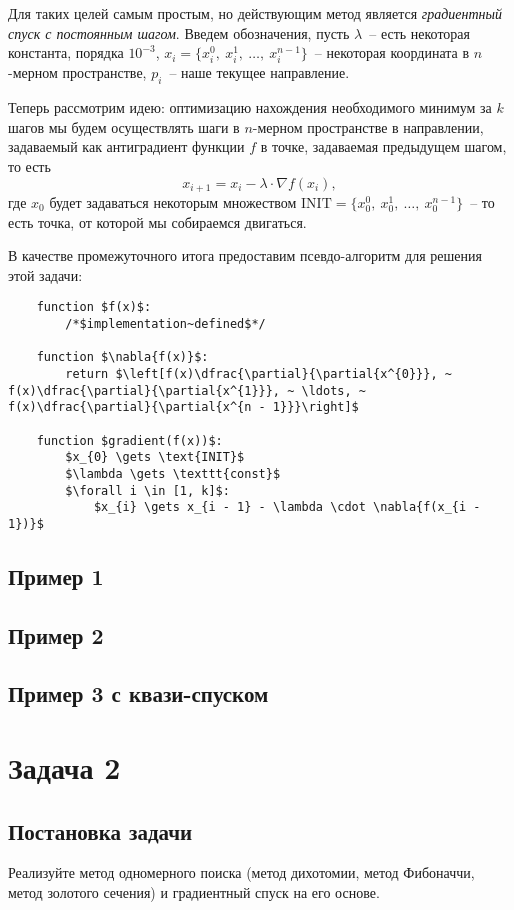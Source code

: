 \documentclass[12pt, a4paper, oneside]{article}
\begin{document}
	Для таких целей самым простым, но действующим метод является \textit{градиентный спуск с постоянным шагом}. 	Введем обозначения, пусть $\lambda$~-- есть некоторая константа, порядка $10^{-3}$, $x_{i} = \{x^{0}_{i}, ~ x^{1}_{i}, ~ \ldots, ~ x^{n - 1}_{i}\}$~-- некоторая координата в $n$-мерном пространстве, $p_{i}$~-- наше текущее направление.

	Теперь рассмотрим идею: оптимизацию нахождения необходимого минимум за $k$ шагов мы будем осуществлять шаги в $n$-мерном пространстве в направлении, задаваемый как антиградиент функции $f$ в точке, задаваемая предыдущем шагом, то есть
	\[
		x_{i + 1} = x_{i} - \lambda \cdot \nabla{f(x_{i})},
	\] где $x_{0}$ будет задаваться некоторым множеством $\text{INIT} = \{x^{0}_{0}, ~ x^{1}_{0}, ~ \ldots, ~ x^{n - 1}_{0}\}$~-- то есть точка, от которой мы собираемся двигаться.

	В качестве промежуточного итога предоставим псевдо-алгоритм для решения этой задачи:
	\begin{lstlisting}
	function $f(x)$:
		/*$implementation~defined$*/
			
	function $\nabla{f(x)}$:
		return $\left[f(x)\dfrac{\partial}{\partial{x^{0}}}, ~ f(x)\dfrac{\partial}{\partial{x^{1}}}, ~ \ldots, ~ f(x)\dfrac{\partial}{\partial{x^{n - 1}}}\right]$
			
	function $gradient(f(x))$:
		$x_{0} \gets \text{INIT}$
		$\lambda \gets \texttt{const}$
		$\forall i \in [1, k]$:
		    $x_{i} \gets x_{i - 1} - \lambda \cdot \nabla{f(x_{i - 1})}$
	\end{lstlisting}
	\subsection*{Пример 1}
	\subsection*{Пример 2}
	\subsection*{Пример 3 с квази-спуском}
	\section*{Задача 2}
	\subsection*{Постановка задачи}
	Реализуйте метод одномерного поиска (метод дихотомии, метод Фибоначчи, метод золотого сечения) и градиентный спуск на его основе.
\end{document}
